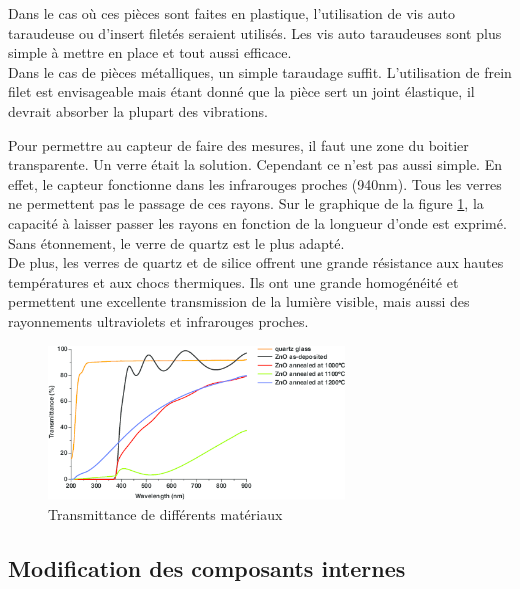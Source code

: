 Dans le cas où ces pièces sont faites en plastique, l’utilisation de vis auto taraudeuse ou d’insert 
filetés seraient utilisés. Les vis auto taraudeuses sont plus simple à mettre en place et tout aussi 
efficace. \\
Dans le cas de pièces métalliques, un simple taraudage suffit. L’utilisation de frein filet est 
envisageable mais étant donné que la pièce sert un joint élastique, il devrait absorber la plupart 
des vibrations.\par 
Pour permettre au capteur de faire des mesures, il faut une zone du boitier transparente. Un verre 
était la solution. Cependant ce n’est pas aussi simple. En effet, le capteur fonctionne dans les infrarouges 
proches (940nm). Tous les verres ne permettent pas le passage de ces rayons. Sur le graphique de la figure \ref{fig:wavelength}, 
la capacité à laisser passer les rayons en fonction de la longueur d’onde est exprimé. Sans étonnement, 
le verre de quartz est le plus adapté.\\
De plus, les verres de quartz et de silice offrent une grande résistance aux hautes températures et 
aux chocs thermiques. Ils ont une grande homogénéité et permettent une excellente transmission de la 
lumière visible, mais aussi des rayonnements ultraviolets et infrarouges proches\footnotemark[1].


\begin{figure}[H]
    \centering
    \includegraphics[width=0.7\textwidth]{Images/photos_PGA/wavelength.png}
    \caption{Transmittance de différents matériaux}
    \label{fig:wavelength}
\end{figure}

\subsection{Modification des composants internes}

